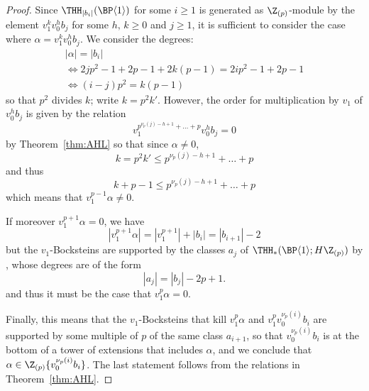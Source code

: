 \begin{proof}
  Since $\THH_{|b_i|}(\BP\langle 1\rangle)$ for some $i\ge 1$ is generated as $\Z_{(p)}$-module by the element $v_1^k v_0^h b_j$ for some $h,\, k \geq 0$ and $j \geq 1$, it is sufficient to consider the case where $\alpha = v_1^k v_0^h b_j$. We consider the degrees:
  \begin{equation}
    \begin{gathered}
      |\alpha| = |b_i| \\
      \iff 2j p^2 - 1 + 2p - 1 + 2k(p-1) = 2i p^2 - 1 + 2p - 1 \\
      \iff (i - j)p^2 = k(p -1)
    \end{gathered}
  \end{equation}
  so that $p^2$ divides $k$; write $k = p^2 k'$. However, the order for multiplication by $v_1$ of $v_0^h b_j$ is given by the relation
  \begin{equation}
    v_1^{p^{\nu_p(j) - h + 1}+ \dots + p} v_0^h b_j = 0
  \end{equation}
  by Theorem~\ref{thm:AHL} so that since $\alpha \neq 0$,
  \begin{equation}
    k = p^2 k' \leq p^{\nu_p(j) - h + 1}+ \dots + p
  \end{equation}
  and thus
  \begin{equation}
    k + p - 1 \leq p^{\nu_p(j) - h + 1}+ \dots + p
  \end{equation}
  which means that $v_1^{p - 1} \alpha \neq 0$.

  If moreover $v_1^{p+1} \alpha = 0$, we have 
  \begin{equation}
    |v_1^{p+1} \alpha| = |v_1^{p+1}| + |b_i| = |b_{i+1}| - 2
  \end{equation}
  but the $v_1$-Bocksteins are supported by the classes $a_j$ of $\THH_*(\BP\langle 1\rangle; H\Z_{(p)})$ by \cite[Theorem~6.4]{AHL10}, whose degrees are of the form
  \begin{equation}
    |a_j| = |b_j| - 2p + 1.
  \end{equation}
  and thus it must be the case that $v_1^p \alpha = 0$.
  
  Finally, this means that the $v_1$-Bocksteins that kill $v_1^p \alpha$ and $v_1^p v_0^{\nu_p(i)} b_i$ are supported by some multiple of $p$ of the same class $a_{i + 1}$, so that $v_0^{\nu_p(i)} b_i$ is at the bottom of a tower of extensions that includes $\alpha$, and we conclude that  $\alpha \in \Z_{(p)}\{ v_0^{\nu_p(i)} b_i \}$. The last statement follows from the relations in Theorem~\ref{thm:AHL}. 
\end{proof}


